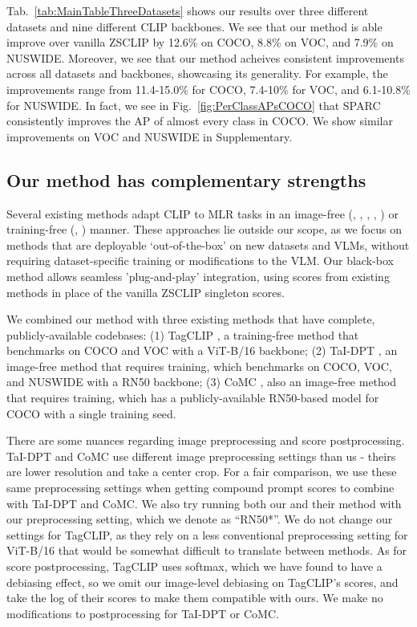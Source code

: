 Tab.~\ref{tab:MainTableThreeDatasets} shows our results over three different datasets and nine different CLIP backbones. We see that our method is able improve over vanilla ZSCLIP by 12.6\% on COCO, 8.8\% on VOC, and 7.9\% on NUSWIDE. Moreover, we see that our method acheives consistent improvements across all datasets and backbones, showcasing its generality. For example, the improvements range from 11.4-15.0\% for COCO, 7.4-10\% for VOC, and 6.1-10.8\% for NUSWIDE. In fact, we see in Fig.~\ref{fig:PerClassAPsCOCO} that SPARC consistently improves the AP of almost every class in COCO. We show similar improvements on VOC and NUSWIDE in Supplementary.

\subsection{Our method has complementary strengths}\label{sec:experiment_complementarity}



Several existing methods adapt CLIP to MLR tasks in an image-free (\cite{TaI-DPT}, \cite{DataFreeMLR}, \cite{TaiPlusPlus}, \cite{CoMC}, \cite{TaI-Adapter}) or training-free (\cite{CLIPSurgery}, \cite{TagCLIP}) manner. These approaches lie outside our scope, as we focus on methods that are deployable `out-of-the-box' on new datasets and VLMs, without requiring dataset-specific training or modifications to the VLM. Our black-box method allows seamless 'plug-and-play' integration, using scores from existing methods in place of the vanilla ZSCLIP singleton scores.

We combined our method with three existing methods that have complete, publicly-available codebases: (1) TagCLIP \cite{TagCLIP}, a training-free method that benchmarks on COCO and VOC with a ViT-B/16 backbone; (2) TaI-DPT \cite{TaI-DPT}, an image-free method that requires training, which benchmarks on COCO, VOC, and NUSWIDE with a RN50 backbone; (3) CoMC \cite{CoMC}, also an image-free method that requires training, which has a publicly-available RN50-based model for COCO with a single training seed.

There are some nuances regarding image preprocessing and score postprocessing. TaI-DPT and CoMC use different image preprocessing settings than us - theirs are lower resolution and take a center crop. For a fair comparison, we use these same preprocessing settings when getting compound prompt scores to combine with TaI-DPT and CoMC. We also try running both our and their method with our preprocessing setting, which we denote as ``RN50*''. We do not change our settings for TagCLIP, as they rely on a less conventional preprocessing setting for ViT-B/16 that would be somewhat difficult to translate between methods. As for score postprocessing, TagCLIP uses softmax, which we have found to have a debiasing effect, so we omit our image-level debiasing on TagCLIP's scores, and take the log of their scores to make them compatible with ours. We make no modifications to postprocessing for TaI-DPT or CoMC.

